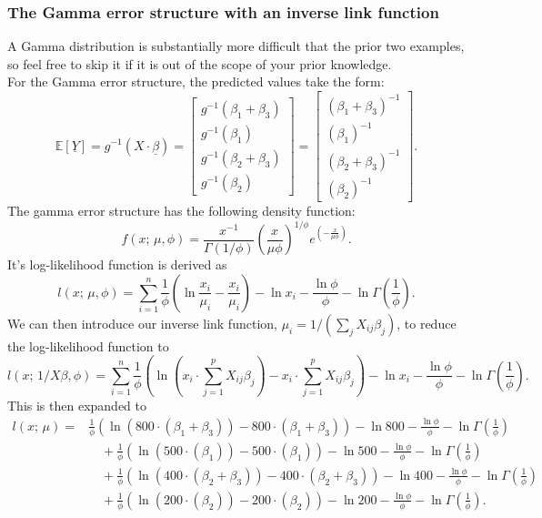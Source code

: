 \documentclass{article}
\begin{document}
\subsubsection{The Gamma error structure with an inverse link function}
A Gamma distribution is substantially more difficult that the prior two examples, so feel free to skip it if it is out of the scope of your prior knowledge. \\
For the Gamma error structure, the predicted values take the form:
\begin{equation}
    \mathbb{E}[\underline{Y}] = g^{-1}(X\cdot \underline{\beta}) = \begin{bmatrix} g^{-1}(\beta_1 + \beta_3) \\ g^{-1}(\beta_1) \\ g^{-1}(\beta_2 + \beta_3) \\ g^{-1}(\beta_2) \end{bmatrix} = \begin{bmatrix} (\beta_1 + \beta_3)^{-1} \\ (\beta_1)^{-1} \\ (\beta_2 + \beta_3)^{-1} \\ (\beta_2)^{-1} \end{bmatrix}.
\end{equation}
The gamma error structure has the following density function:
\begin{equation}
    f(x;\,\mu,\phi) = \frac{x^{-1}}{\Gamma(1/\phi)}\left( \frac{x}{\mu\phi} \right)^{1/\phi}e^{\left( -\frac{x}{\mu\phi} \right)}.
\end{equation}
It's log-likelihood function is derived as 
\begin{equation}
    l(x;\,\mu,\phi) = \sum_{i=1}^n\frac{1}{\phi}\left( \ln{\frac{x_i}{\mu_i}} - \frac{x_i}{\mu_i} \right)-\ln{x_i} - \frac{\ln{\phi}}{\phi} - \ln{\Gamma\left( \frac{1}{\phi} \right)}.
\end{equation}
We can then introduce our inverse link function, $\mu_i = 1/(\sum_j X_{ij}\beta_j)$, to reduce the log-likelihood function to
\begin{equation}
    l(x;\,1/X\beta,\phi) = \sum_{i=1}^n \frac{1}{\phi}\left( \ln{\left( x_i\cdot\sum_{j=1}^p X_{ij}\beta_j \right)}-x_i\cdot\sum_{j=1}^p X_{ij}\beta_j \right)-\ln{x_i} -\frac{\ln{\phi}}{\phi} - \ln{\Gamma\left( \frac{1}{\phi} \right)}.
\end{equation}
This is then expanded to
\begin{align}
    l(x;\,\mu) = &\frac{1}{\phi}(\ln{(800\cdot(\beta_1+\beta_3))} - 800\cdot(\beta_1+\beta_3)) - \ln{800} - \frac{\ln{\phi}}{\phi} - \ln{\Gamma \left( \frac{1}{\phi} \right)} \nonumber \\
    &\quad+ \frac{1}{\phi}(\ln{(500\cdot(\beta_1))} - 500\cdot(\beta_1)) - \ln{500} - \frac{\ln{\phi}}{\phi} - \ln{\Gamma \left( \frac{1}{\phi} \right)} \nonumber \\
    &\quad+ \frac{1}{\phi}(\ln{(400\cdot(\beta_2+\beta_3))} - 400\cdot(\beta_2+\beta_3)) - \ln{400} - \frac{\ln{\phi}}{\phi} - \ln{\Gamma \left( \frac{1}{\phi} \right)} \nonumber \\
    &\quad+ \frac{1}{\phi}(\ln{(200\cdot(\beta_2))} - 200\cdot(\beta_2)) - \ln{200} - \frac{\ln{\phi}}{\phi} - \ln{\Gamma \left( \frac{1}{\phi} \right)}.
\end{align}
\end{document}
